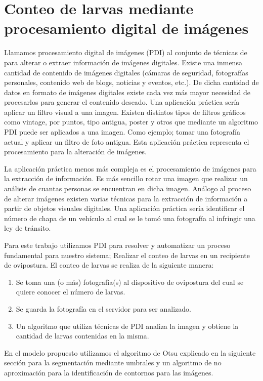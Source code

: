 \section{Conteo de larvas mediante procesamiento digital de imágenes}
Llamamos procesamiento digital de imágenes (PDI) al conjunto de técnicas de para alterar o extraer
información de imágenes digitales. Existe una inmensa cantidad de contenido de imágenes digitales 
(cámaras de seguridad, fotografías personales, contenido web de blogs, noticias y eventos, etc.). 
De dicha cantidad de datos en formato de imágenes digitales existe cada vez más mayor necesidad
de procesarlos para generar el contenido deseado. 
Una aplicación práctica sería aplicar un filtro visual a una imagen. Existen distintos tipos de 
filtros gráficos como vintage, por puntos, tipo antigua, poster y otros que mediante un algoritmo 
PDI puede ser aplicados a una imagen. Como ejemplo; tomar una fotografía actual y aplicar un filtro de foto antigua. Esta aplicación práctica representa el procesamiento para la alteración de imágenes.

La aplicación práctica menos más compleja es el procesamiento de imágenes para la extracción de 
información. Es más sencillo rotar una imagen que realizar un análisis de cuantas personas se 
encuentran en dicha imagen. Análogo al proceso de alterar imágenes existen varias técnicas para la
extracción de información a partir de objetos visuales digitales. Una aplicación práctica sería
identificar el número de chapa de un vehículo al cual se le tomó una fotografía al infringir una 
ley de tránsito.

Para este trabajo utilizamos PDI para resolver y automatizar un proceso fundamental para nuestro
sistema; Realizar el conteo de larvas en un recipiente de ovipostura. El conteo de larvas se realiza 
de la siguiente manera:

\begin{enumerate}
    \item Se toma una (o más) fotografía(s) al dispositivo de ovipostura del cual se quiere conocer el 
    número de larvas.
    \item Se guarda la fotografía en el servidor para ser analizado.
    \item Un algoritmo que utiliza técnicas de PDI analiza la imagen y obtiene la cantidad de larvas
    contenidas en la misma.
\end{enumerate}

En el modelo propuesto utilizamos el algoritmo de Otsu explicado en la siguiente sección para la
segmentación mediante umbrales y un algoritmo de no aproximación para la identificación de contornos
para las imágenes.

